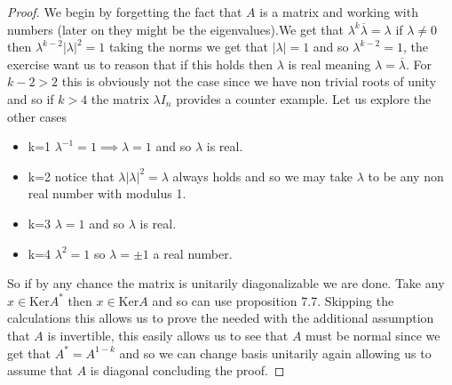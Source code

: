 \documentclass[12pt]{article}
\theoremstyle{definition}
\theoremstyle{remark}
\theoremstyle{plain}
\begin{document}
\begin{proof}
We begin by forgetting the fact that $A$ is a matrix and working with numbers (later on they might be the eigenvalues).We get that $\lambda^k\overline{\lambda}=\lambda$ if $\lambda\neq0$ then $\lambda^{k-2}|\lambda|^2=1$ taking the norms we get that $|\lambda|=1$ and so $\lambda^{k-2}=1$, the exercise want us to reason that if this holds then $\lambda$ is real meaning $\lambda=\overline{\lambda}$. For $k-2>2$ this is obviously not the case since we have non trivial roots of unity and so if $k>4$ the matrix $\lambda I_n$ provides a counter example. Let us explore the other cases
\begin{itemize}
    \item k=1 $\lambda^{-1}=1\implies \lambda=1$ and so $\lambda$ is real.
    \item k=2 notice that $\lambda|\lambda|^2=\lambda$ always holds and so we may take $\lambda$ to be any non real number with modulus 1.
    \item k=3 $\lambda=1$ and so $\lambda$ is real.
    \item k=4 $\lambda^2=1$ so $\lambda=\pm1$ a real number.
\end{itemize}
So if by any chance the matrix is unitarily  diagonalizable we are done.
Take any $x\in \mathrm{Ker} A^*$ then $x\in\mathrm{Ker}A $ and so can use proposition 7.7. Skipping the calculations this allows us to prove the needed with the additional assumption that $A$ is invertible, this easily allows us to see that $A$ must be normal since we get that $A^*=A^{1-k}$ and so we can change basis unitarily  again allowing us to assume that $A$ is diagonal concluding the proof.
\end{proof}
\end{document}
